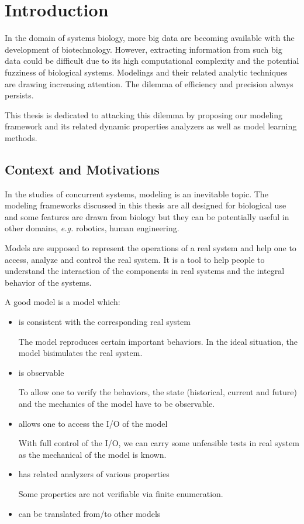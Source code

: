 \chapter{Introduction}\label{chap:intro}
\begin{mybox}
In the domain of systems biology, more big data are becoming available with the development of biotechnology.
However, extracting information from such big data could be difficult due to its high computational complexity and the potential fuzziness of biological systems.
Modelings and their related analytic techniques are drawing increasing attention.
The dilemma of efficiency and precision always persists.

This thesis is dedicated to attacking this dilemma by proposing our modeling framework and its related dynamic properties analyzers as well as model learning methods.
\end{mybox}

\section{Context and Motivations}

In the studies of concurrent systems, modeling is an inevitable topic.
The modeling frameworks discussed in this thesis are all designed for biological use and some features are drawn from biology but they can be potentially useful in other domains, \textit{e.g.} robotics, human engineering.

Models are supposed to represent the operations of a real system and help one to access, analyze and control the real system. 
It is a tool to help people to understand the interaction of the components in real systems and the integral behavior of the systems.

A good model is a model which:

\begin{itemize}
    \item is consistent with the corresponding real system
    
    The model reproduces certain important behaviors.
    In the ideal situation, the model bisimulates the real system.
    \item is observable
    
    To allow one to verify the behaviors, the state (historical, current and future) and the mechanics of the model have to be observable.
    
    \item allows one to access the I/O of the model
    
    With full control of the I/O, we can carry some unfeasible tests in real system as the mechanical of the model is known.
    \item has related analyzers of various properties
    
    Some properties are not verifiable via finite enumeration.
    \item can be translated from/to other models 
\end{itemize}

